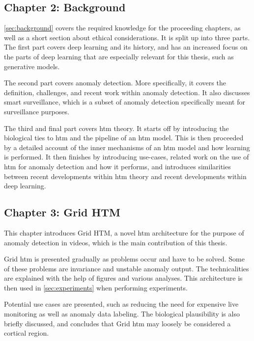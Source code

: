 \subsection*{Chapter 2: Background}
\autoref{sec:background} covers the required knowledge for the proceeding chapters, as well as a short section about ethical considerations. It is split up into three parts. The first part covers deep learning and its history, and has an increased focus on the parts of deep learning that are especially relevant for this thesis, such as generative models.
\par
The second part covers anomaly detection. More specifically, it covers the definition, challenges, and recent work within anomaly detection. It also discusses smart surveillance, which is a subset of anomaly detection specifically meant for surveillance purposes.
\par
The third and final part covers \gls*{htm} theory. It starts off by introducing the biological ties to \gls*{htm} and the pipeline of an \gls*{htm} model. This is then proceeded by a detailed account of the inner mechanisms of an \gls*{htm} model and how learning is performed. It then finishes by introducing use-cases, related work on the use of \gls*{htm} for anomaly detection and how it performs, and introduces similarities between recent developments within \gls*{htm} theory and recent developments within deep learning.
\subsection*{Chapter 3: Grid HTM}
This chapter introduces Grid HTM, a novel \gls*{htm} architecture for the purpose of anomaly detection in videos, which is the main contribution of this thesis.
\par
Grid \gls*{htm} is presented gradually as problems occur and have to be solved. Some of these problems are invariance and unstable anomaly output. The technicalities are explained with the help of figures and various analyses. This architecture is then used in \autoref{sec:experiments} when performing experiments.
\par
Potential use cases are presented, such as reducing the need for expensive live monitoring as well as anomaly data labeling. The biological plausibility is also briefly discussed, and concludes that Grid \gls*{htm} may loosely be considered a cortical region.
